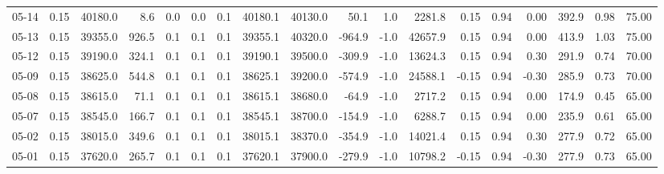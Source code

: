 \begin{threeparttable}
{\begin{tabular}{lrrrrrrrrrrrrrrrrr}
  05-14 &     0.15 & 40180.0 &               8.6 &               0.0 &                0.0 &                0.1 & 40180.1 & 40130.0 &       50.1 &                      1.0 &              2281.8 &       0.15 &      0.94 &           0.00 &            392.9 &            0.98 &                  75.00 \\
  05-13 &     0.15 & 39355.0 &             926.5 &               0.1 &                0.1 &                0.1 & 39355.1 & 40320.0 &     -964.9 &                     -1.0 &             42657.9 &       0.15 &      0.94 &           0.00 &            413.9 &            1.03 &                  75.00 \\
  05-12 &     0.15 & 39190.0 &             324.1 &               0.1 &                0.1 &                0.1 & 39190.1 & 39500.0 &     -309.9 &                     -1.0 &             13624.3 &       0.15 &      0.94 &           0.30 &            291.9 &            0.74 &                  70.00 \\
  05-09 &     0.15 & 38625.0 &             544.8 &               0.1 &                0.1 &                0.1 & 38625.1 & 39200.0 &     -574.9 &                     -1.0 &             24588.1 &      -0.15 &      0.94 &          -0.30 &            285.9 &            0.73 &                  70.00 \\
  05-08 &     0.15 & 38615.0 &              71.1 &               0.1 &                0.1 &                0.1 & 38615.1 & 38680.0 &      -64.9 &                     -1.0 &              2717.2 &       0.15 &      0.94 &           0.00 &            174.9 &            0.45 &                  65.00 \\
  05-07 &     0.15 & 38545.0 &             166.7 &               0.1 &                0.1 &                0.1 & 38545.1 & 38700.0 &     -154.9 &                     -1.0 &              6288.7 &       0.15 &      0.94 &           0.00 &            235.9 &            0.61 &                  65.00 \\
  05-02 &     0.15 & 38015.0 &             349.6 &               0.1 &                0.1 &                0.1 & 38015.1 & 38370.0 &     -354.9 &                     -1.0 &             14021.4 &       0.15 &      0.94 &           0.30 &            277.9 &            0.72 &                  65.00 \\
  05-01 &     0.15 & 37620.0 &             265.7 &               0.1 &                0.1 &                0.1 & 37620.1 & 37900.0 &     -279.9 &                     -1.0 &             10798.2 &      -0.15 &      0.94 &          -0.30 &            277.9 &            0.73 &                  65.00 \\

\end{tabular}}
\end{threeparttable}
